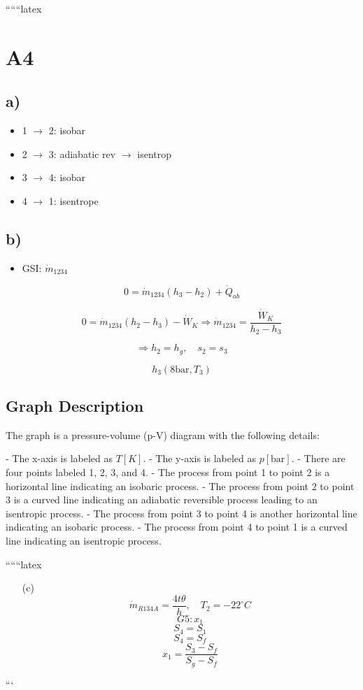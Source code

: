
``````latex


\section*{A4}

\subsection*{a)}

\begin{itemize}
    \item 1 $\rightarrow$ 2: isobar
    \item 2 $\rightarrow$ 3: adiabatic rev $\rightarrow$ isentrop
    \item 3 $\rightarrow$ 4: isobar
    \item 4 $\rightarrow$ 1: isentrope
\end{itemize}

\subsection*{b)}

\begin{itemize}
    \item GSI: $\dot{m}_{1234}$
\end{itemize}

\[
0 = \dot{m}_{1234} (h_3 - h_2) + \dot{Q}_{ab}
\]

\[
0 = \dot{m}_{1234} (h_2 - h_3) - \dot{W}_K \Rightarrow \dot{m}_{1234} = \frac{\dot{W}_K}{h_2 - h_3}
\]

\[
\Rightarrow h_2 = h_g, \quad s_2 = s_3
\]

\[
h_3 (8 \text{bar}, T_3)
\]

\subsection*{Graph Description}

The graph is a pressure-volume (p-V) diagram with the following details:

- The x-axis is labeled as $T [K]$.
- The y-axis is labeled as $p [\text{bar}]$.
- There are four points labeled 1, 2, 3, and 4.
- The process from point 1 to point 2 is a horizontal line indicating an isobaric process.
- The process from point 2 to point 3 is a curved line indicating an adiabatic reversible process leading to an isentropic process.
- The process from point 3 to point 4 is another horizontal line indicating an isobaric process.
- The process from point 4 to point 1 is a curved line indicating an isentropic process.

``````latex

\begin{itemize}
    \item[(c)] 
    \[
    \dot{m}_{R134A} = \frac{4t\theta}{h}, \quad T_2 = -22^\circ C
    \]
    \[
    G5: x_1
    \]
    \[
    S_4 = S_1
    \]
    \[
    S_4 = S_f
    \]
    \[
    x_1 = \frac{S_3 - S_f}{S_g - S_f}
    \]
\end{itemize}

```
